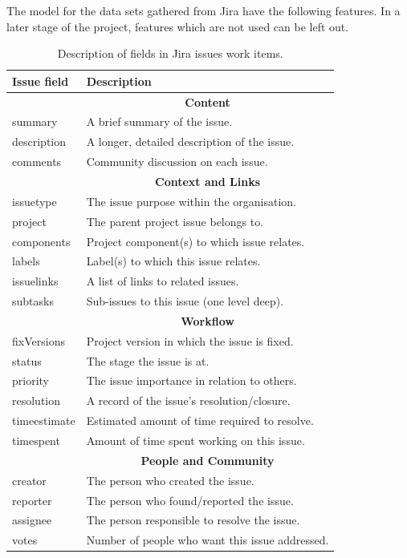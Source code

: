 \documentclass[sigconf]{acmart}
\begin{document}
The model for the data sets gathered from Jira have the following features. In a later stage of the project, features which are not used can be left out.

\begin{table}[h!]
\caption{Description of fields in Jira issues work items.}
\centering
 \begin{tabular}{l l} 
 \hline
 \textbf{Issue field} & \textbf{Description} \\ [0.5ex] 
 \hline\hline
  & \multicolumn{1}{c}{\textbf{Content}} \\
 summary & A brief summary of the issue. \\ 
 description & A longer, detailed description of the issue. \\
 comments & Community discussion on each issue. \\
  & \multicolumn{1}{c}{\textbf{Context and Links}} \\
 issuetype & The issue purpose within the organisation. \\
 project & The parent project issue belongs to. \\
 components & Project component(s) to which issue relates. \\
 labels & Label(s) to which this issue relates. \\
 issuelinks & A list of links to related issues. \\
 subtasks & Sub-issues to this issue (one level deep). \\
  & \multicolumn{1}{c}{\textbf{Workflow}} \\
 fixVersions & Project version in which the issue is fixed. \\
 status & The stage the issue is at. \\
 priority & The issue importance in relation to others. \\
 resolution & A record of the issue’s resolution/closure.  \\
 timeestimate & Estimated amount of time required to resolve. \\
 timespent & Amount of time spent working on this issue. \\
  & \multicolumn{1}{c}{\textbf{People and Community}} \\
 creator & The person who created the issue. \\
 reporter & The person who found/reported the issue. \\
 assignee & The person responsible to resolve the issue. \\
 votes & Number of people who want this issue addressed. \\

\end{tabular}
\end{table}
\end{document}
